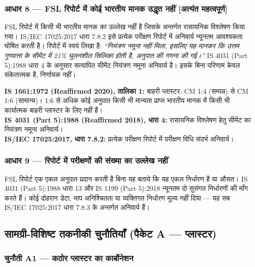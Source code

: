 \documentclass[12pt, a4paper]{article}
\begin{document}
\subsubsection{आधार 8 --- FSL रिपोर्ट में कोई भारतीय मानक उद्धृत नहीं \textbf{[अत्यंत महत्वपूर्ण]}}

\begin{groundbox}
FSL रिपोर्ट में किसी भी भारतीय मानक का उल्लेख नहीं है जिसके अन्तर्गत रासायनिक विश्लेषण किया गया। IS/IEC 17025:2017 धारा 7.8.2 इसे प्रत्येक परीक्षण रिपोर्ट में अनिवार्य न्यूनतम आवश्यकता घोषित करती है। रिपोर्ट में स्वयं लिखा है: \textit{``नियंत्रण नमूना नहीं मिला, इसलिए यह मानकर कि उत्तम गुणवत्ता के सीमेंट में 21\% घुलनशील सिलिका होती है, अनुपात की गणना की गई।''} IS 4031 (Part 5):1988 धारा 4 के अनुसार सत्यापित सीमेंट नियंत्रण नमूना अनिवार्य है। इसके बिना परिणाम केवल संकेतात्मक है, निर्णायक नहीं।
\end{groundbox}

\begin{standardbox}
\textbf{IS 1661:1972 (Reaffirmed 2020), तालिका 1:} बाहरी प्लास्टर: CM 1:4 (सम्पन्न) से CM 1:6 (सामान्य)। 1:6 से अधिक कोई अनुपात किसी भी मान्यता प्राप्त भारतीय मानक में किसी भी कार्यात्मक बाहरी प्लास्टर के लिए नहीं है।\\
\textbf{IS 4031 (Part 5):1988 (Reaffirmed 2018), धारा 4:} रासायनिक विश्लेषण हेतु सीमेंट का नियंत्रण नमूना अनिवार्य।\\
\textbf{IS/IEC 17025:2017, धारा 7.8.2:} प्रत्येक परीक्षण रिपोर्ट में परीक्षण विधि संदर्भ अनिवार्य।
\end{standardbox}

\subsubsection{आधार 9 --- रिपोर्ट में परीक्षणों की संख्या का उल्लेख नहीं}

FSL रिपोर्ट एक एकल अनुपात प्रदान करती है बिना यह बताये कि यह एकल निर्धारण है या औसत। IS 4031 (Part 5):1988 धारा 13 और IS 1199 (Part 5):2018 न्यूनतम दो सुसंगत निर्धारणों की माँग करते हैं। कोई दोहरान डेटा, माप अनिश्चितता या व्यक्तिगत निर्धारण मूल्य नहीं दिया --- यह सब IS/IEC 17025:2017 धारा 7.8.3 के अन्तर्गत अनिवार्य हैं।

\subsection{सामग्री-विशिष्ट तकनीकी चुनौतियाँ (पैकेट A --- प्लास्टर)}

\subsubsection{चुनौती A1 --- कठोर प्लास्टर का कार्बोनेशन}
\end{document}
